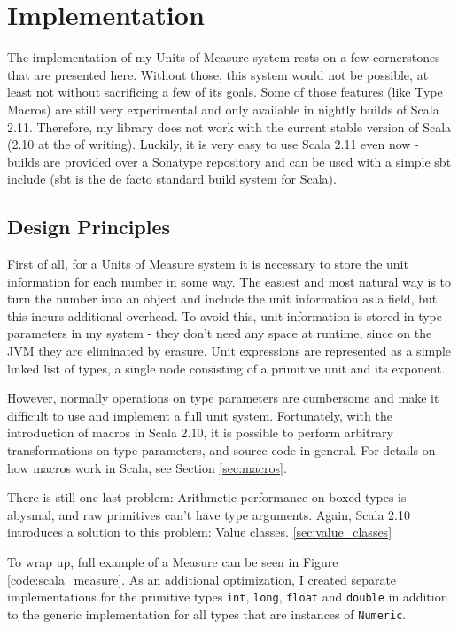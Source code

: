 \documentclass[12pt,oneside,a4paper]{scrbook}
\begin{document}
\chapter{Implementation}

The implementation of my Units of Measure system rests on a few cornerstones that are presented here. Without those, this system would not be possible, at least not without sacrificing a few of its goals. Some of those features (like Type Macros) are still very experimental and only available in nightly builds of Scala 2.11. Therefore, my library does not work with the current stable version of Scala (2.10 at the of writing). Luckily, it is very easy to use Scala 2.11 even now - builds are provided over a Sonatype repository and can be used with a simple sbt include (sbt is the de facto standard build system for Scala).

\section{Design Principles}
First of all, for a Units of Measure system it is necessary to store the unit information for each number in some way. The easiest and most natural way is to turn the number into an object and include the unit information as a field, but this incurs additional overhead. To avoid this, unit information is stored in type parameters in my system - they don't need any space at runtime, since on the JVM they are eliminated by erasure. Unit expressions are represented as a simple linked list of types, a single node consisting of a primitive unit and its exponent.

However, normally operations on type parameters are cumbersome and make it difficult to use and implement a full unit system. Fortunately, with the introduction of macros in Scala 2.10, it is possible to perform arbitrary transformations on type parameters, and source code in general. For details on how macros work in Scala, see Section \ref{sec:macros}.

There is still one last problem: Arithmetic performance on boxed types is abysmal, and raw primitives can't have type arguments. Again, Scala 2.10 introduces a solution to this problem: Value classes. \ref{sec:value_classes}

To wrap up, full example of a Measure can be seen in Figure \ref{code:scala_measure}. As an additional optimization, I created separate implementations for the primitive types \verb|int|, \verb|long|, \verb|float| and \verb|double| in addition to the generic implementation for all types that are instances of \verb|Numeric|.
\end{document}
